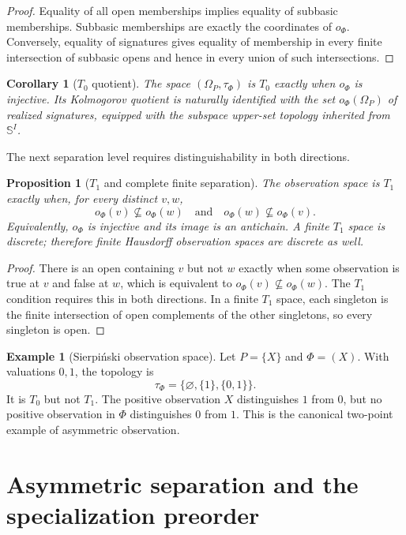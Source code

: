 \documentclass[11pt]{article}
\theoremstyle{definition}
\newtheorem{example}[definition]{Example}
\theoremstyle{plain}
\newtheorem{proposition}[definition]{Proposition}
\newtheorem{corollary}[definition]{Corollary}
\theoremstyle{remark}
\begin{document}
\begin{proof}
Equality of all open memberships implies equality of subbasic memberships.
Subbasic memberships are exactly the coordinates of $o_\Phi$.  Conversely,
equality of signatures gives equality of membership in every finite
intersection of subbasic opens and hence in every union of such intersections.
\end{proof}

\begin{corollary}[$T_0$ quotient]
The space $(\Omega_P,\tau_\Phi)$ is $T_0$ exactly when $o_\Phi$ is injective.  Its
Kolmogorov quotient is naturally identified with the set $o_\Phi(\Omega_P)$ of
realized signatures, equipped with the subspace upper-set topology inherited
from $\mathbb S^I$.
\end{corollary}

The next separation level requires distinguishability in both directions.

\begin{proposition}[$T_1$ and complete finite separation]
The observation space is $T_1$ exactly when, for every distinct $v,w$,
\[
  o_\Phi(v)\nsubseteq o_\Phi(w)
  \quad\text{and}\quad
  o_\Phi(w)\nsubseteq o_\Phi(v).
\]
Equivalently, $o_\Phi$ is injective and its image is an antichain.  A
finite $T_1$ space is discrete; therefore finite Hausdorff observation spaces
are discrete as well.
\end{proposition}

\begin{proof}
There is an open containing $v$ but not $w$ exactly when some observation is
true at $v$ and false at $w$, which is equivalent to
$o_\Phi(v)\nsubseteq o_\Phi(w)$.  The $T_1$ condition requires this in both
directions.  In a finite $T_1$ space, each singleton is the finite intersection
of open complements of the other singletons, so every singleton is open.
\end{proof}

\begin{example}[Sierpi\'nski observation space]
Let $P=\{X\}$ and $\Phi=(X)$.  With valuations $0,1$, the topology is
\[
  \tau_\Phi=\{\varnothing,\{1\},\{0,1\}\}.
\]
It is $T_0$ but not $T_1$.  The positive observation $X$ distinguishes $1$
from $0$, but no positive observation in $\Phi$ distinguishes $0$ from $1$.
This is the canonical two-point example of asymmetric observation.
\end{example}

\section{Asymmetric separation and the specialization preorder}
\end{document}
